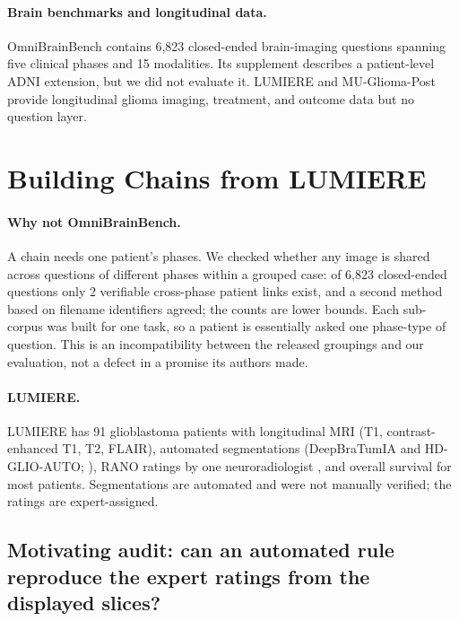 \documentclass[conference]{IEEEtran}
\begin{document}
\paragraph{Brain benchmarks and longitudinal data.} OmniBrainBench \citep{peng2026omnibrainbench} contains 6,823 closed-ended brain-imaging questions spanning five clinical phases and 15 modalities. Its supplement describes a patient-level ADNI extension, but we did not evaluate it. LUMIERE \citep{suter2022lumiere} and MU-Glioma-Post \citep{muglioma2025post} provide longitudinal glioma imaging, treatment, and outcome data but no question layer.





\section{Building Chains from LUMIERE}
\label{sec:lumiere}

\paragraph{Why not OmniBrainBench.} A chain needs one patient's phases. We checked whether any image is shared across questions of different phases within a grouped case: of 6,823 closed-ended questions only 2 verifiable cross-phase patient links exist, and a second method based on filename identifiers agreed; the counts are lower bounds. Each sub-corpus was built for one task, so a patient is essentially asked one phase-type of question. This is an incompatibility between the released groupings and our evaluation, not a defect in a promise its authors made.

\paragraph{LUMIERE.} LUMIERE \citep{suter2022lumiere} has 91 glioblastoma patients with longitudinal MRI (T1, contrast-enhanced T1, T2, FLAIR), automated segmentations (DeepBraTumIA and HD-GLIO-AUTO; \citealp{suter2022lumiere, kickingereder2019automated}), RANO ratings by one neuroradiologist \citep{wen2010updated}, and overall survival for most patients. Segmentations are automated and were not manually verified; the ratings are expert-assigned.

\subsection{Motivating audit: can an automated rule reproduce the expert ratings from the displayed slices?}
\label{sec:audit}
\end{document}
